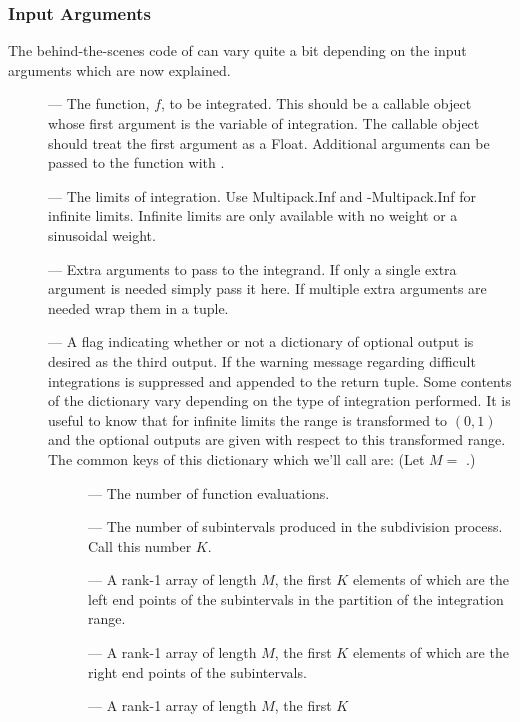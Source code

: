 \subsubsection{Input Arguments}

The behind-the-scenes code of  can vary quite a bit depending
on the input arguments which are now explained.
\begin{description}
\item[] --- The function, $f$, to be integrated.  This should be
a callable object whose first argument is the variable of integration.
The callable object should treat the first argument as a Float.
Additional arguments can be passed to the function with . 
\item[] --- The limits of integration.  Use Multipack.Inf
and -Multipack.Inf for infinite limits. Infinite limits are only
available with no weight or a sinusoidal weight.  
\item[] --- Extra arguments to pass to the integrand.
If only a single extra argument is needed simply pass it here.  If
multiple extra arguments are needed wrap them in a tuple.
\item[] --- A flag indicating whether or not a
dictionary of optional output is desired as the third output.  If
 the warning message regarding difficult
integrations is suppressed and appended to the return tuple.  Some
contents of the dictionary vary depending on the type of integration
performed.  It is useful to know that for infinite limits the range is
transformed to $(0,1)$ and the optional outputs are given with respect
to this transformed range. The common keys of this dictionary which
we'll call  are: (Let $M=$ .)
\begin{description}
\item[] --- The number of function evaluations.
\item[] --- The number of subintervals produced in the
subdivision process.  Call this number $K$.
\item[] --- A rank-1 array of length $M$, the first $K$
elements of which are the left end points of the subintervals in the
partition of the integration range.  
\item[] --- A rank-1 array of length $M$, the first $K$
elements of which are the right end points of the subintervals. 
\item[] --- A rank-1 array of length $M$, the first $K$

\end{description}
\end{description}
